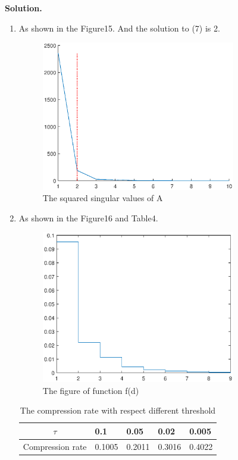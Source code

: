 \documentclass[english,onecolumn]{IEEEtran}
\begin{document}
\noindent
\textbf{Solution.}
\begin{enumerate}
\item
	As shown in the Figure15. And the solution to (7) is 2.\\
			\begin{figure}[htbp]
						\centering
						\includegraphics[width=0.8\textwidth]{fig5_1.eps}
						\caption{The squared singular values of A}
			\end{figure}
\item
	As shown in the Figure16 and Table4.\\
			\begin{figure}[htbp]
						\centering
						\includegraphics[width=0.8\textwidth]{fig5_2.eps}
						\caption{The figure of function f(d)}
			\end{figure}
		\begin{table}[htb]
    \centering
    \begin{tabular}{|l|l|l|l|l|}
    \hline
    \multicolumn{1}{|c|}{$\tau$} & 0.1 & 0.05 & 0.02 & 0.005 \\ \hline
    Compression rate             & 0.1005  &  0.2011  &  0.3016  & 0.4022 \\ \hline
    \end{tabular}
    \caption{The compression rate with respect different threshold}
    \end{table}

\end{enumerate}
\end{document}
